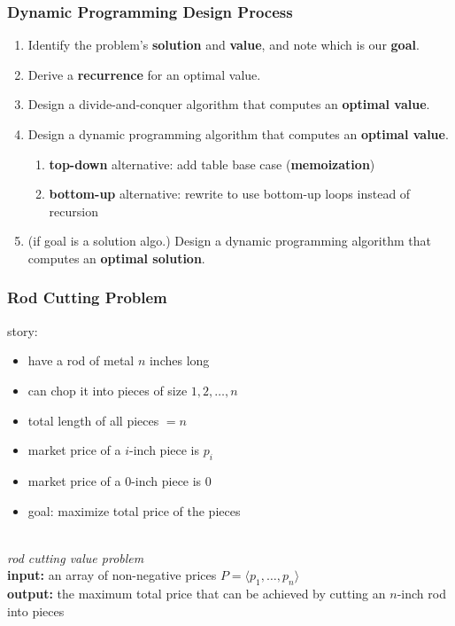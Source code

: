 \documentclass[10pt,aspectratio=169]{beamer}
\newcommand{\stanza}{ \\~\ }
\begin{document}
\begin{frame} \frametitle{Dynamic Programming Design Process}
\begin{enumerate}
  \item Identify the problem's \textbf{solution} and \textbf{value}, and note which is our \textbf{goal}.
  \item Derive a \textbf{recurrence} for an optimal value.
  \item Design a divide-and-conquer algorithm that computes an \textbf{optimal value}.
  \item Design a dynamic programming algorithm that computes an \textbf{optimal value}.
  \begin{enumerate}
    \item \textbf{top-down} alternative: add table base case (\textbf{memoization})
    \item \textbf{bottom-up} alternative: rewrite to use bottom-up loops instead of recursion
  \end{enumerate}
  \item (if goal is a solution algo.) Design a dynamic programming algorithm that computes an \textbf{optimal solution}.
\end{enumerate}
\end{frame}

\begin{frame} \frametitle{Rod Cutting Problem}
story:
\begin{itemize}
  \item have a rod of metal $n$ inches long
  \item can chop it into pieces of size $1, 2, \ldots, n$
  \item total length of all pieces $=n$
  \item market price of a $i$-inch piece is $p_i$
  \item market price of a 0-inch piece is 0
  \item goal: maximize total price of the pieces \stanza
\end{itemize}

\emph{rod cutting value problem} \\
\textbf{input:} an array of non-negative prices $P=\langle p_1, \ldots, p_n \rangle$ \\
\textbf{output:} the maximum total price that can be achieved by cutting an $n$-inch rod into pieces
  
\end{frame}
\end{document}
